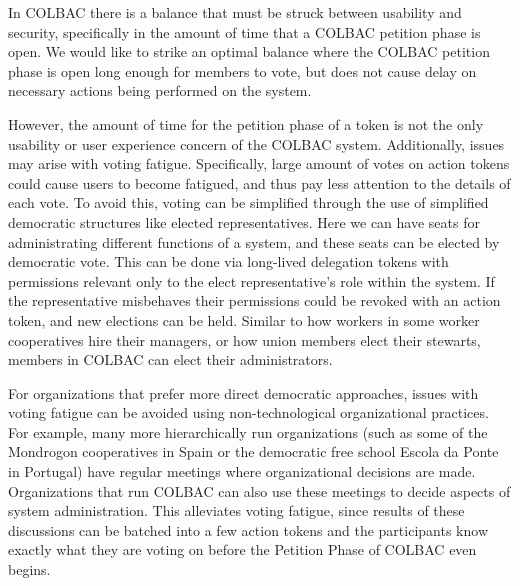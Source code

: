 
In COLBAC there is a balance that must be struck between usability and security,
specifically in the amount of time that a COLBAC petition phase is open. We
would like to strike an optimal balance where the COLBAC petition phase is open
long enough for members to vote, but does not cause delay on necessary actions
being performed on the system.

However, the amount of time for the petition phase of a token is not the only
usability or user experience concern of the COLBAC system. Additionally, issues
may arise with voting fatigue. Specifically, large amount of votes on action
tokens could cause users to become fatigued, and thus pay less attention to the
details of each vote. To avoid this, voting can be simplified through the use of
simplified democratic structures like elected representatives. Here we can have
seats for administrating different functions of a system, and these seats can be
elected by democratic vote. This can be done via long-lived delegation tokens
with permissions relevant only to the elect representative's role within the
system. If the representative misbehaves their permissions could be revoked with
an action token, and new elections can be held. Similar to how workers in some
worker cooperatives hire their managers, or how union members elect their
stewarts, members in COLBAC can elect their administrators.

For organizations that prefer more direct democratic approaches, issues with
voting fatigue can be avoided using non-technological organizational practices.
For example, many more hierarchically run organizations (such as some of the 
Mondrogon cooperatives in Spain or the democratic free school Escola da Ponte in
Portugal) have regular meetings where organizational decisions are made.
Organizations that run COLBAC can also use these meetings to decide aspects of
system administration. This alleviates voting fatigue, since results of these
discussions can be batched into a few action tokens and the participants know
exactly what they are voting on before the Petition Phase of COLBAC even begins.
